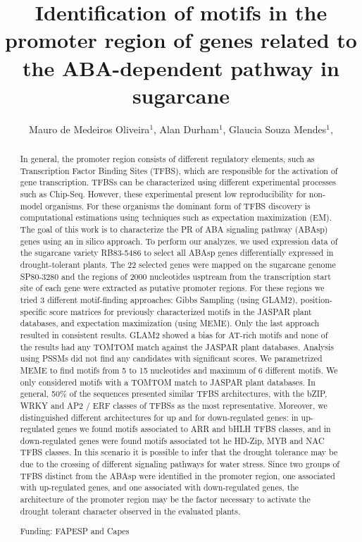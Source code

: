 \documentclass[twoside]{article}
\title{\vspace{-15mm}\fontsize{24pt}{10pt}\selectfont\textbf{ Identification of motifs in the promoter region of genes related to the ABA-dependent pathway in sugarcane }} %
\author{ Mauro de Medeiros Oliveira$^{1}$, Alan Durham$^{1}$, Glaucia Souza Mendes$^{1}$, }
\affil{ 1 University of Sao Paulo

 }
\date{}
\begin{document}
  
  
  \maketitle %
  
  
  \thispagestyle{fancy} %
  
  
  \begin{abstract}
  In general, the promoter region consists of different regulatory elements, such as Transcription
Factor Binding Sites (TFBS), which are responsible for the activation of gene transcription. TFBSs
can be characterized using different experimental processes such as Chip-Seq. However, these
experimental present low reproducibility for non-model organisms. For these organisms the
dominant form of TFBS discovery is computational estimations using techniques such as
expectation maximization (EM). The goal of this work is to characterize the PR of ABA signaling
pathway (ABAsp) genes using an in silico approach. To perform our analyzes, we used expression
data of the sugarcane variety RB83-5486 to select all ABAsp genes differentially expressed in
drought-tolerant plants. The 22 selected genes were mapped on the sugarcane genome SP80-3280
and the regions of 2000 nucleotides usptream from the transcription start site of each gene were
extracted as putative promoter regions. For these regions we tried 3 different motif-finding
approaches: Gibbs Sampling (using GLAM2), position-specific score matrices for previously
characterized motifs in the JASPAR plant databases, and expectation maximization (using MEME).
Only the last approach resulted in consistent results. GLAM2 showed a bias for AT-rich motifs and
none of the results had any TOMTOM match against the JASPAR plant databases. Analysis using
PSSMs did not find any candidates with significant scores. We parametrized MEME to find motifs
from 5 to 15 nucleotides and maximum of 6 different motifs. We only considered motifs with a
TOMTOM match to JASPAR plant databases. In general, 50\% of the sequences presented similar
TFBS architectures, with the bZIP, WRKY and AP2 / ERF classes of TFBSs as the most
representative. Moreover, we distinguished different architectures for up and for down-regulated
genes: in up-regulated genes we found motifs associated to ARR and bHLH TFBS classes, and in
down-regulated genes were found motifs associated tot he HD-Zip, MYB and NAC TFBS classes.
In this scenario it is possible to infer that the drought tolerance may be due to the crossing of
different signaling pathways for water stress. Since two groups of TFBS distinct from the ABAsp
were identified in the promoter region, one associated with up-regulated genes, and one associated
with down-regulated genes, the architecture of the promoter region may be the factor necessary to
activate the drought tolerant character observed in the evaluated plants.
  
  Funding: FAPESP and Capes \\ 
  \end{abstract}
  
\end{document}
